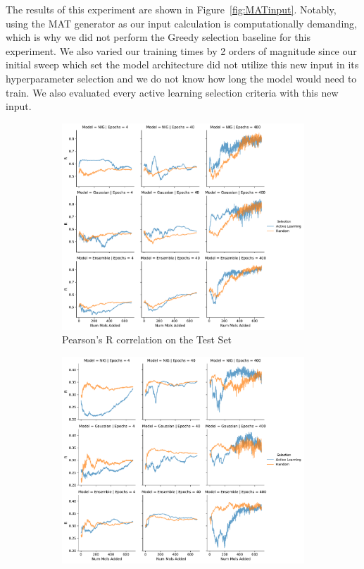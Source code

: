 \documentclass[journal=jmcmar,manuscript=article]{achemso}
\begin{document}
The results of this experiment are shown in Figure~\ref{fig:MATinput}. Notably, using the MAT generator as our input calculation is computationally demanding, which is why we did not perform the Greedy selection baseline for this experiment. We also varied our training times by 2 orders of magnitude since our initial sweep which set the model architecture did not utilize this new input in its hyperparameter selection and we do not know how long the model would need to train. We also evaluated every active learning selection criteria with this new input.



\begin{figure}[tbph]
    \centering
    \begin{subfigure}[b]{0.48\textwidth}
        \includegraphics[width=1\linewidth]{figures/fig6_MAT_input_R.pdf}
        \caption{Pearson's R correlation on the Test Set}
    \end{subfigure}%
    \hfill
    \begin{subfigure}[b]{0.48\textwidth}
        \includegraphics[width=1\linewidth]{figures/fig6_MAT_input_R_rest.pdf}

\end{subfigure}
\end{figure}
\end{document}
